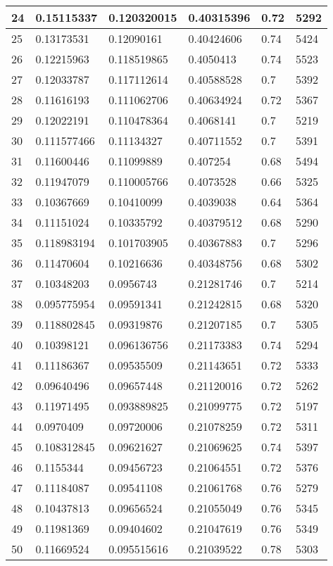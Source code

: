 \begin{longtable}{|l|l|l|l|l|l|}
24 & 0.15115337 & 0.120320015 & 0.40315396 & 0.72 & 5292 \\ \hline 
25 & 0.13173531 & 0.12090161 & 0.40424606 & 0.74 & 5424 \\ \hline 
26 & 0.12215963 & 0.118519865 & 0.4050413 & 0.74 & 5523 \\ \hline 
27 & 0.12033787 & 0.117112614 & 0.40588528 & 0.7 & 5392 \\ \hline 
28 & 0.11616193 & 0.111062706 & 0.40634924 & 0.72 & 5367 \\ \hline 
29 & 0.12022191 & 0.110478364 & 0.4068141 & 0.7 & 5219 \\ \hline 
30 & 0.111577466 & 0.11134327 & 0.40711552 & 0.7 & 5391 \\ \hline 
31 & 0.11600446 & 0.11099889 & 0.407254 & 0.68 & 5494 \\ \hline 
32 & 0.11947079 & 0.110005766 & 0.4073528 & 0.66 & 5325 \\ \hline 
33 & 0.10367669 & 0.10410099 & 0.4039038 & 0.64 & 5364 \\ \hline 
34 & 0.11151024 & 0.10335792 & 0.40379512 & 0.68 & 5290 \\ \hline 
35 & 0.118983194 & 0.101703905 & 0.40367883 & 0.7 & 5296 \\ \hline 
36 & 0.11470604 & 0.10216636 & 0.40348756 & 0.68 & 5302 \\ \hline 
37 & 0.10348203 & 0.0956743 & 0.21281746 & 0.7 & 5214 \\ \hline 
38 & 0.095775954 & 0.09591341 & 0.21242815 & 0.68 & 5320 \\ \hline 
39 & 0.118802845 & 0.09319876 & 0.21207185 & 0.7 & 5305 \\ \hline 
40 & 0.10398121 & 0.096136756 & 0.21173383 & 0.74 & 5294 \\ \hline 
41 & 0.11186367 & 0.09535509 & 0.21143651 & 0.72 & 5333 \\ \hline 
42 & 0.09640496 & 0.09657448 & 0.21120016 & 0.72 & 5262 \\ \hline 
43 & 0.11971495 & 0.093889825 & 0.21099775 & 0.72 & 5197 \\ \hline 
44 & 0.0970409 & 0.09720006 & 0.21078259 & 0.72 & 5311 \\ \hline 
45 & 0.108312845 & 0.09621627 & 0.21069625 & 0.74 & 5397 \\ \hline 
46 & 0.1155344 & 0.09456723 & 0.21064551 & 0.72 & 5376 \\ \hline 
47 & 0.11184087 & 0.09541108 & 0.21061768 & 0.76 & 5279 \\ \hline 
48 & 0.10437813 & 0.09656524 & 0.21055049 & 0.76 & 5345 \\ \hline 
49 & 0.11981369 & 0.09404602 & 0.21047619 & 0.76 & 5349 \\ \hline 
50 & 0.11669524 & 0.095515616 & 0.21039522 & 0.78 & 5303 \\ \hline 
\end{longtable}